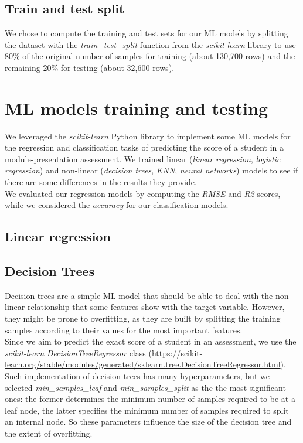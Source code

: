 \documentclass{article}
\begin{document}
\subsection{Train and test split}

We chose to compute the training and test sets for our ML models by splitting the dataset with the \textit{train\_test\_split} function from the \textit{scikit-learn} library to use 80\% of the original number of samples for training (about 130,700 rows) and the remaining 20\% for testing (about 32,600 rows).

\section{ML models training and testing}
We leveraged the \textit{scikit-learn} Python library to implement some ML models for the regression and classification tasks of predicting the score of a student in a module-presentation assessment. We trained linear (\textit{linear regression}, \textit{logistic regression}) and non-linear (\textit{decision trees}, \textit{KNN}, \textit{neural networks}) models to see if there are some differences in the results they provide.\\

We evaluated our regression models by computing the \textit{RMSE} and \textit{R2} scores, while we considered the \textit{accuracy} for our classification models.

\subsection{Linear regression}


\subsection{Decision Trees}

Decision trees are a simple ML model that should be able to deal with the non-linear relationship that some features show with the target variable. However, they might be prone to overfitting, as they are built by splitting the training samples according to their values for the most important features.\\

Since we aim to predict the exact score of a student in an assessment, we use the \textit{scikit-learn} \textit{DecisionTreeRegressor} class (\url{https://scikit-learn.org/stable/modules/generated/sklearn.tree.DecisionTreeRegressor.html}). Such implementation of decision trees has many hyperparameters, but we selected \textit{min\_samples\_leaf} and \textit{min\_samples\_split} as the the most significant ones: the former determines the minimum number of samples required to be at a leaf node, the latter specifies the minimum number of samples required to split an internal node. So these parameters influence the size of the decision tree and the extent of overfitting.\\
\end{document}

